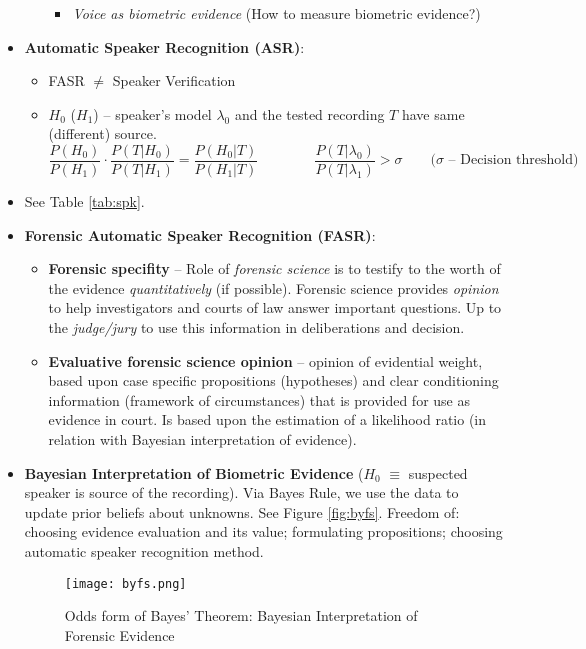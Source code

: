 \documentclass[a4paper]{article}
\begin{document}
\begin{itemize}
\begin{itemize}
\begin{itemize}
            \item \emph{Voice as biometric evidence} (How to measure biometric evidence?)
          \end{itemize}
        \end{itemize}
        \item \textbf{Automatic Speaker Recognition (ASR)}:
        \begin{itemize}
          \item FASR $\neq$ Speaker Verification
          \item $H_0$ ($H_1$) -- speaker's model $\lambda_0$ and the tested recording $T$ have same (different) source.
          $$\frac{P(H_0)}{P(H_1)}\cdot\frac{P(T|H_0)}{P(T|H_1)}=\frac{P(H_0|T)}{P(H_1|T)}\qquad\qquad\frac{P(T|\lambda_0)}{P(T|\lambda_1)}>\sigma\qquad\text{($\sigma$ -- Decision threshold)}$$
        \end{itemize}
        \item See Table \ref{tab:spk}.
        \item \textbf{Forensic Automatic Speaker Recognition (FASR)}:
        \begin{itemize}
          \item \textbf{Forensic specifity} -- Role of \emph{forensic science} is to testify to the worth of the evidence \emph{quantitatively} (if possible). Forensic science provides \emph{opinion} to help investigators and courts of law answer important questions. Up to the \emph{judge/jury} to use this information in deliberations and decision.
          \item \textbf{Evaluative forensic science opinion} -- opinion of evidential weight, based upon case specific propositions (hypotheses) and clear conditioning information (framework of circumstances) that is provided for use as evidence in court. Is based upon the estimation of a likelihood ratio (in relation with Bayesian interpretation of evidence).
        \end{itemize}
        \item \textbf{Bayesian Interpretation of Biometric Evidence} ($H_0$ $\equiv$ suspected speaker is source of the recording). Via Bayes Rule, we use the data to update prior beliefs about unknowns. See Figure \ref{fig:byfs}. Freedom of: choosing evidence evaluation and its value; formulating propositions; choosing automatic speaker recognition method.
          \begin{figure}[htp]
            \centering
              \texttt{[image: byfs.png]}
              \caption{Odds form of Bayes' Theorem: Bayesian Interpretation of Forensic Evidence}

\end{figure}
\end{itemize}
\end{document}
